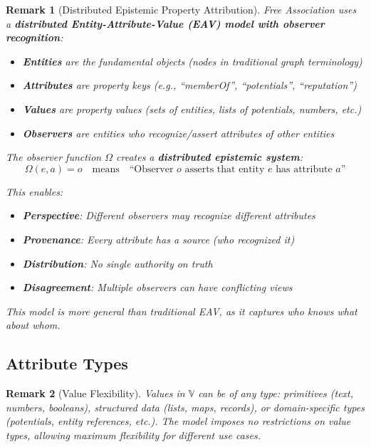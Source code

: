 \documentclass[11pt]{article}
\newtheorem{remark}{Remark}
\begin{document}
\begin{remark}[Distributed Epistemic Property Attribution]
Free Association uses a \textbf{distributed Entity-Attribute-Value (EAV) model with observer recognition}:
\begin{itemize}
\item \textbf{Entities} are the fundamental objects (nodes in traditional graph terminology)
\item \textbf{Attributes} are property keys (e.g., ``memberOf'', ``potentials'', ``reputation'')
\item \textbf{Values} are property values (sets of entities, lists of potentials, numbers, etc.)
\item \textbf{Observers} are entities who recognize/assert attributes of other entities
\end{itemize}

The observer function $\Omega$ creates a \textbf{distributed epistemic system}:
\[
\Omega(e, a) = o \quad \text{means} \quad \text{``Observer } o \text{ asserts that entity } e \text{ has attribute } a\text{''}
\]

This enables:
\begin{itemize}
\item \textbf{Perspective}: Different observers may recognize different attributes
\item \textbf{Provenance}: Every attribute has a source (who recognized it)
\item \textbf{Distribution}: No single authority on truth
\item \textbf{Disagreement}: Multiple observers can have conflicting views
\end{itemize}

This model is more general than traditional EAV, as it captures \emph{who knows what about whom}.
\end{remark}

\subsection{Attribute Types}

\begin{remark}[Value Flexibility]
Values in $\mathbb{V}$ can be of any type: primitives (text, numbers, booleans), structured data (lists, maps, records), or domain-specific types (potentials, entity references, etc.). The model imposes no restrictions on value types, allowing maximum flexibility for different use cases.
\end{remark}
\end{document}
